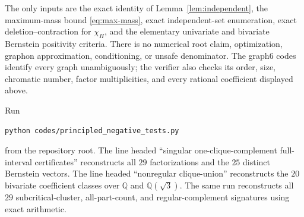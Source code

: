 \documentclass[11pt]{article}
\begin{document}
The only inputs are the exact identity of Lemma~\ref{lem:independent}, the
maximum-mass bound \eqref{eq:max-mass}, exact independent-set enumeration,
exact deletion--contraction for $\chi_H$, and the elementary univariate and
bivariate Bernstein positivity criteria.  There is no numerical root claim,
optimization, graphon approximation, conditioning, or unsafe denominator.
The graph6 codes identify every graph unambiguously; the verifier also checks
its order, size, chromatic number, factor multiplicities, and every rational
coefficient displayed above.

Run
\begin{verbatim}
python codes/principled_negative_tests.py
\end{verbatim}
from the repository root.  The line headed ``singular
one-clique-complement full-interval certificates'' reconstructs all $29$
factorizations and the $25$ distinct Bernstein vectors.  The line headed
``nonregular clique-union'' reconstructs the
$20$ bivariate coefficient classes over $\mathbb Q$ and
$\mathbb Q(\sqrt3)$.  The same run reconstructs all $29$
subcritical-cluster, all-part-count, and regular-complement signatures using
exact arithmetic.
\end{document}
